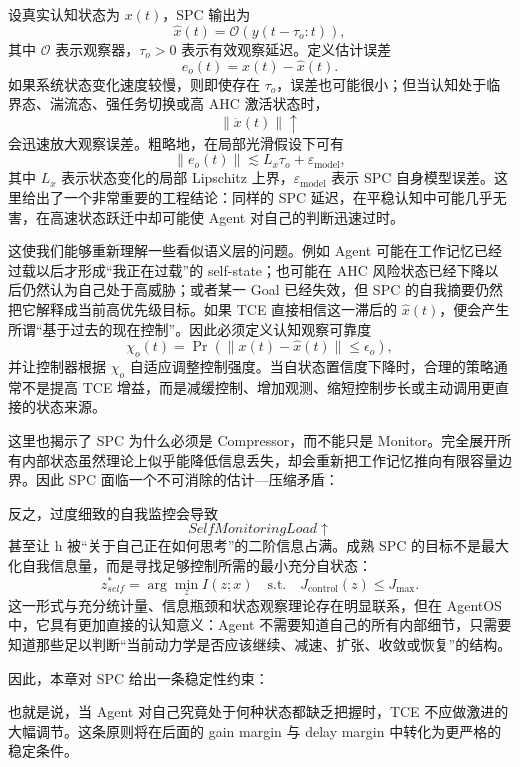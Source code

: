 设真实认知状态为 $x(t)$，SPC 输出为
\[
\hat{x}(t)
=
\mathcal{O}
\left(
y(t-\tau_o:t)
\right),
\]
其中 $\mathcal{O}$ 表示观察器，$\tau_o>0$ 表示有效观察延迟。定义估计误差
\[
e_o(t)
=
x(t)-\hat{x}(t).
\]
如果系统状态变化速度较慢，则即使存在 $\tau_o$，误差也可能很小；但当认知处于临界态、湍流态、强任务切换或高 AHC 激活状态时，
\[
\left\|\dot{x}(t)\right\|\uparrow
\]
会迅速放大观察误差。粗略地，在局部光滑假设下可有
\[
\|e_o(t)\|
\lesssim
L_x\tau_o
+
\varepsilon_{\mathrm{model}},
\]
其中 $L_x$ 表示状态变化的局部 Lipschitz 上界，$\varepsilon_{\mathrm{model}}$ 表示 SPC 自身模型误差。这里给出了一个非常重要的工程结论：同样的 SPC 延迟，在平稳认知中可能几乎无害，在高速状态跃迁中却可能使 Agent 对自己的判断迅速过时。

这使我们能够重新理解一些看似语义层的问题。例如 Agent 可能在工作记忆已经过载以后才形成“我正在过载”的 self-state；也可能在 AHC 风险状态已经下降以后仍然认为自己处于高威胁；或者某一 Goal 已经失效，但 SPC 的自我摘要仍然把它解释成当前高优先级目标。如果 TCE 直接相信这一滞后的 $\hat{x}(t)$，便会产生所谓“基于过去的现在控制”。因此必须定义认知观察可靠度
\[
\chi_o(t)
=
\Pr
\left(
\|x(t)-\hat{x}(t)\|
\le \epsilon_o
\right),
\]
并让控制器根据 $\chi_o$ 自适应调整控制强度。当自状态置信度下降时，合理的策略通常不是提高 TCE 增益，而是减缓控制、增加观测、缩短控制步长或主动调用更直接的状态来源。

这里也揭示了 SPC 为什么必须是 Compressor，而不能只是 Monitor。完全展开所有内部状态虽然理论上似乎能降低信息丢失，却会重新把工作记忆推向有限容量边界。因此 SPC 面临一个不可消除的估计—压缩矛盾：
\begin{statementbox}
\centering
{}
\end{statementbox}
反之，过度细致的自我监控会导致
\[
SelfMonitoringLoad\uparrow
\]
甚至让 h 被“关于自己正在如何思考”的二阶信息占满。成熟 SPC 的目标不是最大化自我信息量，而是寻找足够控制所需的最小充分自状态：
\[
z_{self}^{*}
=
\arg\min_{z}
I(z;x)
\quad
\text{s.t.}
\quad
J_{\mathrm{control}}(z)
\le
J_{\max}.
\]
这一形式与充分统计量、信息瓶颈和状态观察理论存在明显联系，但在 AgentOS 中，它具有更加直接的认知意义：Agent 不需要知道自己的所有内部细节，只需要知道那些足以判断“当前动力学是否应该继续、减速、扩张、收敛或恢复”的结构。

因此，本章对 SPC 给出一条稳定性约束：
\begin{statementbox}
\centering
{}
\end{statementbox}
也就是说，当 Agent 对自己究竟处于何种状态都缺乏把握时，TCE 不应做激进的大幅调节。这条原则将在后面的 gain margin 与 delay margin 中转化为更严格的稳定条件。

